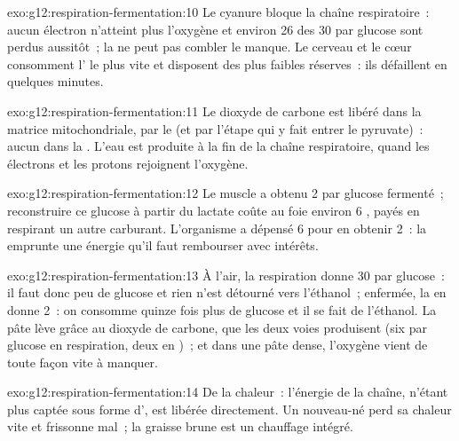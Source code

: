 \begin{solution}{exo:g12:respiration-fermentation:10}
Le cyanure bloque la chaîne respiratoire~: aucun électron n'atteint
plus l'oxygène et environ 26 des 30  par glucose sont perdus
aussitôt~; la  ne peut pas combler le manque. Le cerveau
et le cœur consomment l' le plus vite et disposent des plus faibles
réserves~: ils défaillent en quelques minutes.
\end{solution}

\begin{solution}{exo:g12:respiration-fermentation:11}
Le dioxyde de carbone est libéré dans la matrice mitochondriale, par
le  (et par l'étape qui y fait entrer le pyruvate)~:
aucun dans la . L'eau est produite à la fin de la chaîne
respiratoire, quand les électrons et les protons rejoignent l'oxygène.
\end{solution}

\begin{solution}{exo:g12:respiration-fermentation:12}
Le muscle a obtenu 2  par glucose fermenté~; reconstruire ce
glucose à partir du lactate coûte au foie environ 6 , payés en
respirant un autre carburant. L'organisme a dépensé 6 pour en obtenir
2~: la  emprunte une énergie qu'il faut rembourser avec
intérêts.
\end{solution}

\begin{solution}{exo:g12:respiration-fermentation:13}
À l'air, la respiration donne 30  par glucose~: il faut donc peu de
glucose et rien n'est détourné vers l'éthanol~; enfermée, la
 en donne 2~: on consomme quinze fois plus de glucose et
il se fait de l'éthanol. La pâte lève grâce au dioxyde de carbone, que
les deux voies produisent (six par glucose en respiration, deux en
)~; et dans une pâte dense, l'oxygène vient de toute façon
vite à manquer.
\end{solution}

\begin{solution}{exo:g12:respiration-fermentation:14}
De la chaleur~: l'énergie de la chaîne, n'étant plus captée sous forme
d', est libérée directement. Un nouveau-né perd sa chaleur vite et
frissonne mal~; la graisse brune est un chauffage intégré.
\end{solution}


